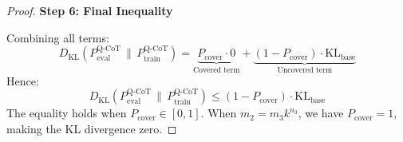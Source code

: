 \begin{proof}
\vspace{0.5em}

\noindent \textbf{Step 6: Final Inequality}

Combining all terms:
\[
D_{\mathrm{KL}}\left(P_{\text{eval}}^{\text{Q-CoT}} \,\big\|\, P_{\text{train}}^{\text{Q-CoT}}\right) = \underbrace{P_{\text{cover}} \cdot 0}_{\text{Covered term}} + \underbrace{(1-P_{\text{cover}}) \cdot \mathrm{KL}_{\text{base}}}_{\text{Uncovered term}}
\]
Hence:
\[
D_{\mathrm{KL}}\left(P_{\text{eval}}^{\text{Q-CoT}} \,\big\|\, P_{\text{train}}^{\text{Q-CoT}}\right) \leq (1 - P_{\text{cover}}) \cdot \mathrm{KL}_{\text{base}}
\]
The equality holds when $P_{\text{cover}} \in [0,1]$. When $m_2 = m_3 k^{n_3}$, we have $P_{\text{cover}} = 1$, making the KL divergence zero.
\end{proof}

